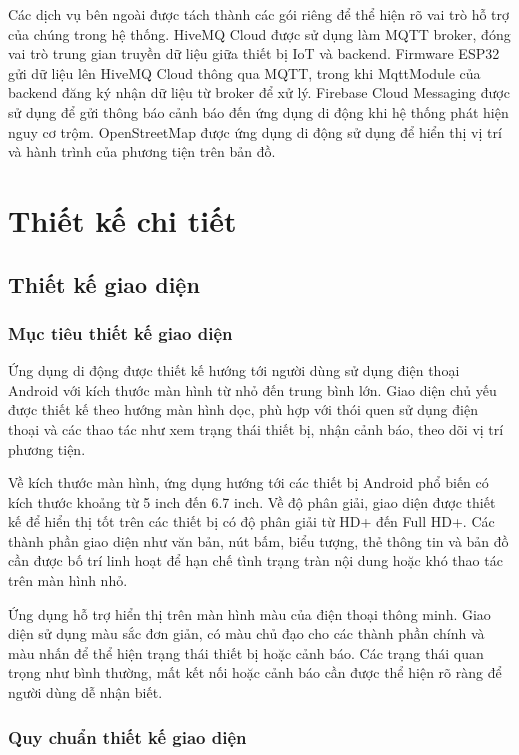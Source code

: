 \documentclass[../DoAn.tex]{subfiles}
\begin{document}
Các dịch vụ bên ngoài được tách thành các gói riêng để thể hiện rõ vai trò hỗ trợ của chúng trong hệ thống. HiveMQ Cloud được sử dụng làm MQTT broker, đóng vai trò trung gian truyền dữ liệu giữa thiết bị IoT và backend. Firmware ESP32 gửi dữ liệu lên HiveMQ Cloud thông qua MQTT, trong khi MqttModule của backend đăng ký nhận dữ liệu từ broker để xử lý. Firebase Cloud Messaging được sử dụng để gửi thông báo cảnh báo đến ứng dụng di động khi hệ thống phát hiện nguy cơ trộm. OpenStreetMap được ứng dụng di động sử dụng để hiển thị vị trí và hành trình của phương tiện trên bản đồ.

\section{Thiết kế chi tiết}
\subsection{Thiết kế giao diện}
\subsubsection{Mục tiêu thiết kế giao diện}
Ứng dụng di động được thiết kế hướng tới người dùng sử dụng điện thoại Android với kích thước màn hình từ nhỏ đến trung bình lớn. Giao diện chủ yếu được thiết kế theo hướng màn hình dọc, phù hợp với thói quen sử dụng điện thoại và các thao tác như xem trạng thái thiết bị, nhận cảnh báo, theo dõi vị trí phương tiện.

Về kích thước màn hình, ứng dụng hướng tới các thiết bị Android phổ biến có kích thước khoảng từ 5 inch đến 6.7 inch. Về độ phân giải, giao diện được thiết kế để hiển thị tốt trên các thiết bị có độ phân giải từ HD+ đến Full HD+. Các thành phần giao diện như văn bản, nút bấm, biểu tượng, thẻ thông tin và bản đồ cần được bố trí linh hoạt để hạn chế tình trạng tràn nội dung hoặc khó thao tác trên màn hình nhỏ.

Ứng dụng hỗ trợ hiển thị trên màn hình màu của điện thoại thông minh. Giao diện sử dụng màu sắc đơn giản, có màu chủ đạo cho các thành phần chính và màu nhấn để thể hiện trạng thái thiết bị hoặc cảnh báo. Các trạng thái quan trọng như bình thường, mất kết nối hoặc cảnh báo cần được thể hiện rõ ràng để người dùng dễ nhận biết.

\subsubsection{Quy chuẩn thiết kế giao diện}
\label{subsubsection:4.2.1.ui_standard}
\end{document}
